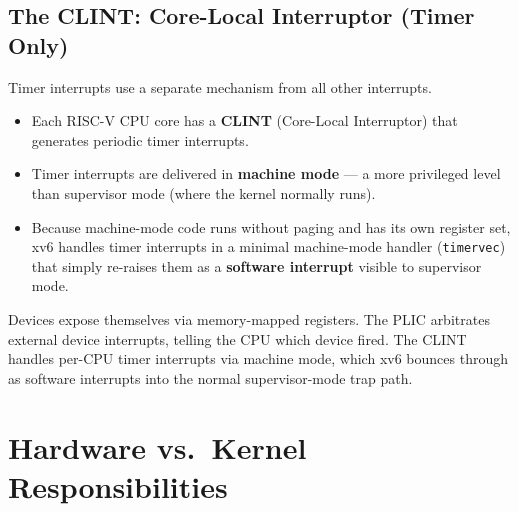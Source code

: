 \documentclass[11pt, a4paper]{article}
\begin{document}
\subsection{The CLINT: Core-Local Interruptor (Timer Only)}

Timer interrupts use a separate mechanism from all other interrupts.

\begin{itemize}[leftmargin=1.5em]
  \item Each RISC-V CPU core has a \textbf{CLINT} (Core-Local Interruptor) that generates periodic timer interrupts.
  \item Timer interrupts are delivered in \textbf{machine mode} --- a more privileged level than supervisor mode (where the kernel normally runs).
  \item Because machine-mode code runs without paging and has its own register set, xv6 handles timer interrupts in a minimal machine-mode handler (\lstinline|timervec|) that simply re-raises them as a \textbf{software interrupt} visible to supervisor mode.
\end{itemize}

\begin{tcolorbox}[summary, title={Section Summary}]
Devices expose themselves via memory-mapped registers. The PLIC arbitrates external device interrupts, telling the CPU which device fired. The CLINT handles per-CPU timer interrupts via machine mode, which xv6 bounces through as software interrupts into the normal supervisor-mode trap path.
\end{tcolorbox}

\section{Hardware vs.\ Kernel Responsibilities}
\end{document}
